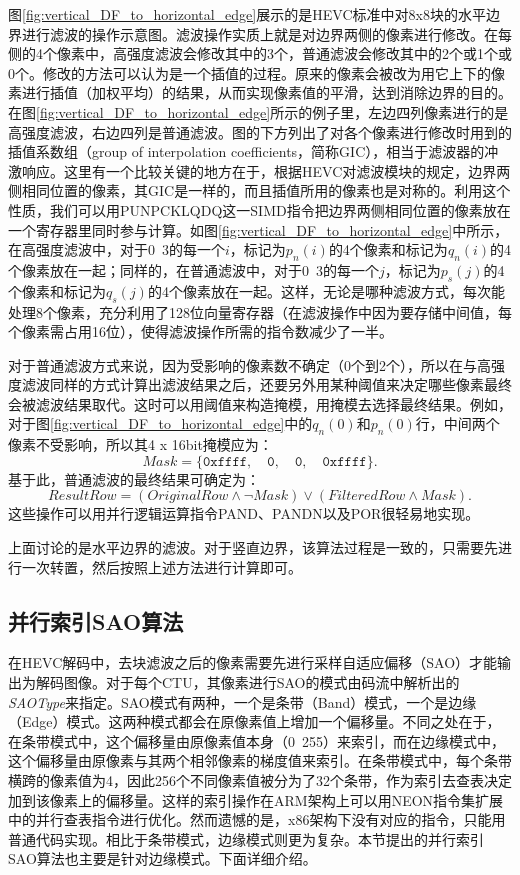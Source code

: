 图\ref{fig:vertical_DF_to_horizontal_edge}展示的是HEVC标准中对8x8块的水平边界进行滤波的操作示意图。滤波操作实质上就是对边界两侧的像素进行修改。在每侧的4个像素中，高强度滤波会修改其中的3个，普通滤波会修改其中的2个或1个或0个。修改的方法可以认为是一个插值的过程。原来的像素会被改为用它上下的像素进行插值（加权平均）的结果，从而实现像素值的平滑，达到消除边界的目的。在图\ref{fig:vertical_DF_to_horizontal_edge}所示的例子里，左边四列像素进行的是高强度滤波，右边四列是普通滤波。图的下方列出了对各个像素进行修改时用到的插值系数组（group of interpolation coefficients，简称GIC），相当于滤波器的冲激响应\supercite{Norkin-TCSVT2012}。这里有一个比较关键的地方在于，根据HEVC对滤波模块的规定，边界两侧相同位置的像素，其GIC是一样的，而且插值所用的像素也是对称的。利用这个性质，我们可以用PUNPCKLQDQ这一SIMD指令把边界两侧相同位置的像素放在一个寄存器里同时参与计算。如图\ref{fig:vertical_DF_to_horizontal_edge}中所示，在高强度滤波中，对于0~3的每一个$i$，标记为$p_n(i)$的4个像素和标记为$q_n(i)$的4个像素放在一起；同样的，在普通滤波中，对于0~3的每一个$j$，标记为$p_s(j)$的4个像素和标记为$q_s(j)$的4个像素放在一起。这样，无论是哪种滤波方式，每次能处理8个像素，充分利用了128位向量寄存器（在滤波操作中因为要存储中间值，每个像素需占用16位），使得滤波操作所需的指令数减少了一半。

对于普通滤波方式来说，因为受影响的像素数不确定（0个到2个），所以在与高强度滤波同样的方式计算出滤波结果之后，还要另外用某种阈值来决定哪些像素最终会被滤波结果取代。这时可以用阈值来构造掩模，用掩模去选择最终结果。例如，对于图\ref{fig:vertical_DF_to_horizontal_edge}中的$q_n(0)$和$p_n(0)$行，中间两个像素不受影响，所以其4 x 16bit掩模应为：
\begin{equation}
Mask = \{ \texttt{0xffff}, \quad \texttt{0}, \quad \texttt{0}, \quad \texttt{0xffff} \}.
\end{equation}
基于此，普通滤波的最终结果可确定为：
\begin{equation}
ResultRow = (OriginalRow \land \neg Mask ) \lor (FilteredRow \land Mask).
\end{equation}
这些操作可以用并行逻辑运算指令PAND、PANDN以及POR很轻易地实现。

上面讨论的是水平边界的滤波。对于竖直边界，该算法过程是一致的，只需要先进行一次转置，然后按照上述方法进行计算即可。

\subsection{并行索引SAO算法}

在HEVC解码中，去块滤波之后的像素需要先进行采样自适应偏移（SAO）才能输出为解码图像。对于每个CTU，其像素进行SAO的模式由码流中解析出的\textit{SAOType}来指定。SAO模式有两种，一个是条带（Band）模式，一个是边缘（Edge）模式。这两种模式都会在原像素值上增加一个偏移量。不同之处在于，在条带模式中，这个偏移量由原像素值本身（0~255）来索引，而在边缘模式中，这个偏移量由原像素与其两个相邻像素的梯度值来索引。在条带模式中，每个条带横跨的像素值为4，因此256个不同像素值被分为了32个条带，作为索引去查表决定加到该像素上的偏移量。这样的索引操作在ARM架构上可以用NEON指令集扩展中的并行查表指令进行优化。然而遗憾的是，x86架构下没有对应的指令，只能用普通代码实现。相比于条带模式，边缘模式则更为复杂。本节提出的并行索引SAO算法也主要是针对边缘模式。下面详细介绍。

